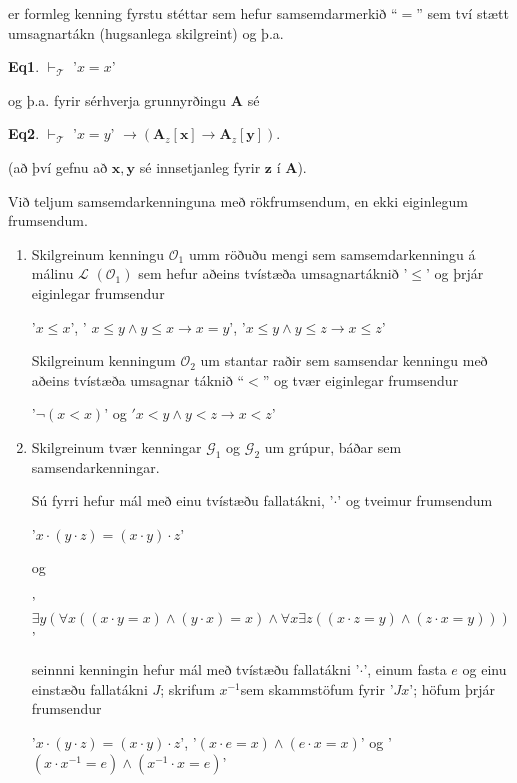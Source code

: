 \documentclass[12pt]{book}
\begin{document}
\begin{skgr} er formleg kenning fyrstu stéttar sem hefur
  samsemdarmerkið ``$=$'' sem tví stætt umsagnartákn (hugsanlega skilgreint) og
  þ.a.


  \textbf{Eq1}. $\vdash_{\mathcal{T}}$ '$x = x$'

  og þ.a. fyrir sérhverja grunnyrðingu $\mathbf{A}$ sé


 \textbf{Eq2}. $\vdash_{\mathcal{T}}$ '$x = y$' $\rightarrow ( \mathbf{A}_z[\mathbf{x}] \rightarrow \mathbf{A}_z[\mathbf{y}])$.

  (að því gefnu að $\mathbf{x}, \mathbf{y}$ sé innsetjanleg fyrir $\mathbf{z}$ í $\mathbf{A}$).

  Við teljum samsemdarkenninguna með rökfrumsendum, en ekki eiginlegum frumsendum.
\end{skgr}

\begin{daemi}
  \begin{enumerate}[(1)]
  \item Skilgreinum kenningu $\mathcal{O}_1$ umm röðuðu mengi
    sem samsemdarkenningu á málinu $\mathcal{L}$ $(\mathcal{O}_{1})$ sem hefur aðeins
    tvístæða umsagnartáknið '$\leq$' og þrjár eiginlegar frumsendur


    '$x \leq x$', ' $x \leq y \wedge y \leq x \rightarrow x = y$', '$x \leq y \wedge y \leq z \rightarrow x \leq z$'

    Skilgreinum kenningum $\mathcal{O}_2$ um stantar raðir sem samsendar kenningu
    með aðeins tvístæða umsagnar táknið ``$<$'' og tvær eiginlegar frumsendur


    '$\lnot (x < x)$' og $' x < y \wedge y < z \rightarrow x < z$'

  \item
    Skilgreinum tvær kenningar $\mathcal{G}_1$ og $\mathcal{G}_2$ um grúpur,
    báðar sem samsendarkenningar.

    Sú fyrri hefur mál með einu tvístæðu fallatákni,
    '$\cdot$' og tveimur frumsendum


    '$x \cdot (y \cdot z) = (x \cdot y) \cdot z$'

    og

    '$\exists y (\forall x (( x \cdot y = x) \wedge (y \cdot x) = x) \wedge \forall x \exists z ((x \cdot z = y) \wedge (z \cdot x = y)))$'

    seinnni kenningin hefur mál með tvístæðu fallatákni '$\cdot$', einum
    fasta $e$ og einu einstæðu fallatákni $J$; skrifum $x^{-1}$sem skammstöfum fyrir '$Jx$'; höfum þrjár frumsendur

    '$x \cdot (y \cdot z) = (x \cdot y) \cdot z$', '$(x \cdot e = x) \wedge ( e \cdot x = x)$' og '$(x\cdot x^{-1} = e) \wedge (x^{-1} \cdot x = e)$'
  \end{enumerate}


\end{daemi}
\end{document}
